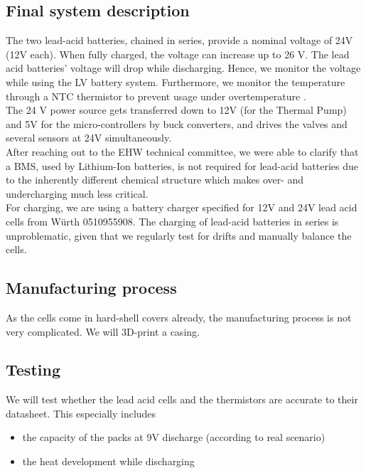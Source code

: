 \subsection{Final system description}
The two lead-acid batteries, chained in series, provide a nominal voltage of 24V (12V each). When fully charged, the voltage can increase up to 26 V. The lead acid batteries' voltage will drop while discharging. Hence, we monitor the voltage while using the LV battery system. Furthermore, we monitor the temperature through a NTC thermistor to prevent usage under overtemperature . \\
The 24 V power source gets transferred down to 12V (for the Thermal Pump) and 5V for the micro-controllers by buck converters, and drives the valves and several sensors at 24V simultaneously. \\
After reaching out to the EHW technical committee, we were able to clarify that a BMS, used by Lithium-Ion batteries, is not required for lead-acid batteries due to the inherently different chemical structure which makes over- and undercharging much less critical. \\
For charging, we are using a battery charger specified for 12V and 24V lead acid cells from Würth 0510955908. The charging of lead-acid batteries in series is unproblematic, given that we regularly test for drifts and manually balance the cells.\\

\subsection{Manufacturing process}
As the cells come in hard-shell covers already, the manufacturing process is not very complicated. We will 3D-print a casing.

\subsection{Testing}
We will test whether the lead acid cells and the thermistors are accurate to their datasheet. This especially includes \begin{itemize}
    \item the capacity of the packs at 9V discharge (according to real scenario)
    \item the heat development while discharging
\end{itemize}
